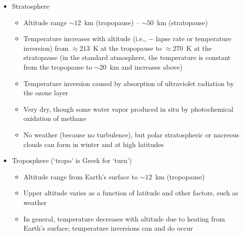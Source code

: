 \documentclass[11pt, oneside]{article}
\begin{document}
\begin{itemize}
\begin{itemize}
\begin{itemize}
		\end{itemize}
		\item Stratosphere
		\begin{itemize}
			\item[--] Altitude range ${\sim}12$~km (tropopause) -- ${\sim}50$~km (stratopause)
			\item[--] Temperature increases with altitude (i.e., $-$ lapse rate or temperature inversion) from ${\approx}213$~K at the tropopause to ${\approx}270$~K at the stratopause (in the standard atmosphere, the temperature is constant from the tropopause to ${\sim}20$~km and increases above)
			\item[--] Temperature inversion caused by absorption of ultraviolet radiation by the ozone layer
			\item[--] Very dry, though some water vapor produced in situ by photochemical oxidation of methane
			\item[--] No weather (because no turbulence), but polar stratospheric or nacreous clouds can form in winter and at high latitudes
		\end{itemize}
		\item Troposphere (`tropo' is Greek for `turn')
		\begin{itemize}
			\item[--] Altitude range from Earth's surface to ${\sim}12$~km (tropopause)
			\item[--] Upper altitude varies as a function of latitude and other factors, such as weather
			\item[--] In general, temperature decreases with altitude due to heating from Earth's surface; temperature inversions can and do occur

\end{itemize}
\end{itemize}
\end{itemize}
\end{document}
